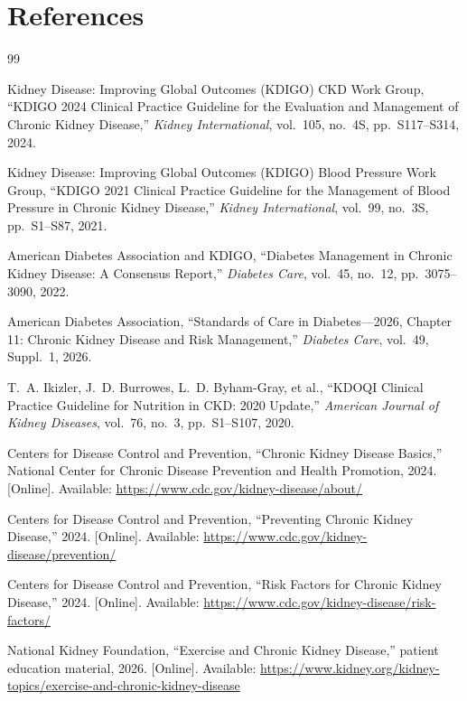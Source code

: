\chapter*{References}

\begin{thebibliography}{99}
\small

Kidney Disease: Improving Global Outcomes (KDIGO) CKD Work Group,
``KDIGO 2024 Clinical Practice Guideline for the Evaluation and Management of
Chronic Kidney Disease,''
\emph{Kidney International}, vol.~105, no.~4S, pp.~S117--S314, 2024.

Kidney Disease: Improving Global Outcomes (KDIGO) Blood Pressure Work Group,
``KDIGO 2021 Clinical Practice Guideline for the Management of Blood Pressure in
Chronic Kidney Disease,''
\emph{Kidney International}, vol.~99, no.~3S, pp.~S1--S87, 2021.

American Diabetes Association and KDIGO,
``Diabetes Management in Chronic Kidney Disease: A Consensus Report,''
\emph{Diabetes Care}, vol.~45, no.~12, pp.~3075--3090, 2022.

American Diabetes Association,
``Standards of Care in Diabetes---2026, Chapter 11: Chronic Kidney Disease and
Risk Management,''
\emph{Diabetes Care}, vol.~49, Suppl.~1, 2026.

T.~A. Ikizler, J.~D. Burrowes, L.~D. Byham-Gray, et al.,
``KDOQI Clinical Practice Guideline for Nutrition in CKD: 2020 Update,''
\emph{American Journal of Kidney Diseases}, vol.~76, no.~3, pp.~S1--S107, 2020.

Centers for Disease Control and Prevention,
``Chronic Kidney Disease Basics,''
National Center for Chronic Disease Prevention and Health Promotion, 2024.
[Online]. Available: \url{https://www.cdc.gov/kidney-disease/about/}

Centers for Disease Control and Prevention,
``Preventing Chronic Kidney Disease,'' 2024.
[Online]. Available: \url{https://www.cdc.gov/kidney-disease/prevention/}

Centers for Disease Control and Prevention,
``Risk Factors for Chronic Kidney Disease,'' 2024.
[Online]. Available: \url{https://www.cdc.gov/kidney-disease/risk-factors/}

National Kidney Foundation,
``Exercise and Chronic Kidney Disease,'' patient education material, 2026.
[Online]. Available:
\url{https://www.kidney.org/kidney-topics/exercise-and-chronic-kidney-disease}


\end{thebibliography}
